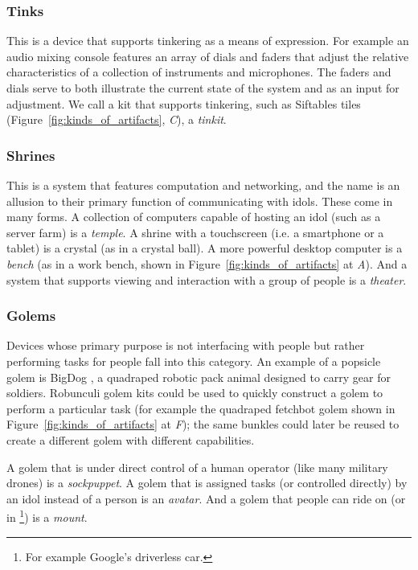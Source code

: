 \subsubsection{Tinks}
This is a device that supports tinkering as a means of expression. For example an audio mixing console features an array of dials and faders that adjust the relative characteristics of a collection of instruments and microphones. 
The faders and dials serve to both illustrate the current state of the system and as an input for adjustment. 
We call a kit that supports tinkering, such as Siftables tiles \citep{siftables} (Figure~\ref{fig:kinds_of_artifacts}, \emph{C}), a \emph{tinkit}. 

\subsubsection{Shrines}
This is a system that features computation and networking, and the name is an allusion to their primary function of communicating with idols. 
These come in many forms. A collection of computers capable of hosting an idol (such as a server farm) is a \emph{temple}. 
A shrine with a touchscreen (i.e. a smartphone or a tablet) is a crystal (as in a crystal ball). 
A more powerful desktop computer is a \emph{bench} (as in a work bench, shown in Figure~\ref{fig:kinds_of_artifacts} at \emph{A}). 
And a system that supports viewing and interaction with a group of people is a \emph{theater}.

\subsubsection{Golems}
Devices whose primary purpose is not interfacing with people but rather performing tasks for people fall into this category. 
An example of a popsicle golem is BigDog \citep{bigdog}, a quadraped robotic pack animal designed to carry gear for soldiers. 
Robunculi golem kits could be used to quickly construct a golem to perform a particular task (for example the quadraped fetchbot golem shown in Figure~\ref{fig:kinds_of_artifacts} at \emph{F}); the same bunkles could later be reused to create a different golem with different capabilities. 

A golem that is under direct control of a human operator (like many military drones) is a \emph{sockpuppet}. A golem that is assigned tasks (or controlled directly) by an idol instead of a person is an \emph{avatar}. And a golem that people can ride on (or in%
\footnote{For example Google's driverless car.})
is a \emph{mount}.

